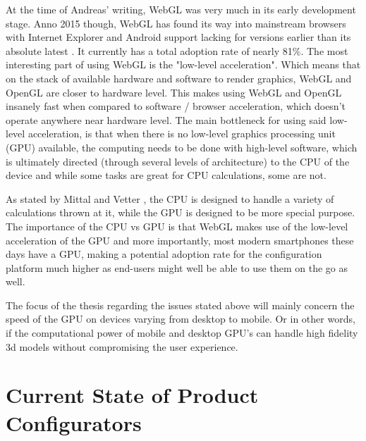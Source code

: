 At the time of Andreas' writing, WebGL was very much in its early development stage. Anno 2015 though, WebGL has found its way into mainstream browsers with Internet Explorer and Android support lacking for versions earlier than its absolute latest \cite{Can I Use}. It currently has a total adoption rate of nearly 81\%. The most interesting part of using WebGL is the "low-level acceleration". Which means that on the stack of available hardware and software to render graphics, WebGL and OpenGL are closer to hardware level. This makes using WebGL and OpenGL insanely fast when compared to software / browser acceleration, which doesn't operate anywhere near hardware level.
The main bottleneck for using said low-level acceleration, is that when there is no low-level graphics processing unit (GPU) available, the computing needs to be done with high-level software, which is ultimately directed (through several levels of architecture) to the CPU of the device and while some tasks are great for CPU calculations, some are not.
\newline 

\cite{Heterogeneous Computing Techniques}
\newline

As stated by Mittal and Vetter \cite{Heterogeneous Computing Techniques}, the CPU is designed to handle a variety of calculations thrown at it, while the GPU is designed to be more special purpose.
The importance of the CPU vs GPU is that WebGL makes use of the low-level acceleration of the GPU and more importantly, most modern smartphones these days have a GPU, making a potential adoption rate for the configuration platform much higher as end-users might well be able to use them on the go as well.


The focus of the thesis regarding the issues stated above will mainly concern the speed of the GPU on devices varying from desktop to mobile. Or in other words, if the computational power of mobile and desktop GPU's can handle high fidelity 3d models without compromising the user experience.

\section{Current State of Product Configurators}



\newpage